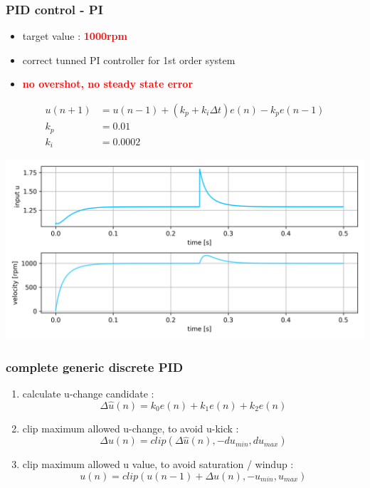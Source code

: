 \documentclass{beamer}
\begin{document}
\begin{frame}
  
  \frametitle{\bf PID control - PI}

  \begin{itemize}
    \item  target value : \textcolor{red}{\bf 1000rpm}
    \item  correct tunned PI controller for 1st order system
    \item  \textcolor{red}{\bf no overshot, no steady state error}
  \end{itemize}

  \begin{align*}
    u(n+1) &= u(n-1) + (k_p + k_i\Delta t) e(n) - k_pe(n-1) \\
    k_p    &= 0.01 \\
    k_i    &= 0.0002
  \end{align*}

  {\centering \includegraphics[scale=0.4]{../images/motor_control/pid_pi_control_1.png}}

\end{frame}



\begin{frame}
  
  \frametitle{\bf complete generic discrete PID}

  \begin{enumerate}
    \item  calculate u-change candidate :
      $$\Delta \hat{u}(n) = k_0e(n) + k_1e(n) + k_2e(n)$$
    
    \item clip maximum allowed u-change, to avoid u-kick :
      $$\Delta u(n) = clip(\Delta \hat{u}(n), -du_{min}, du_{max})$$

    \item clip maximum allowed u value, to avoid saturation / windup :
      $$u(n) = clip(u(n-1) + \Delta u(n), -u_{min}, u_{max})$$
  \end{enumerate}
  
\end{frame}
\end{document}

